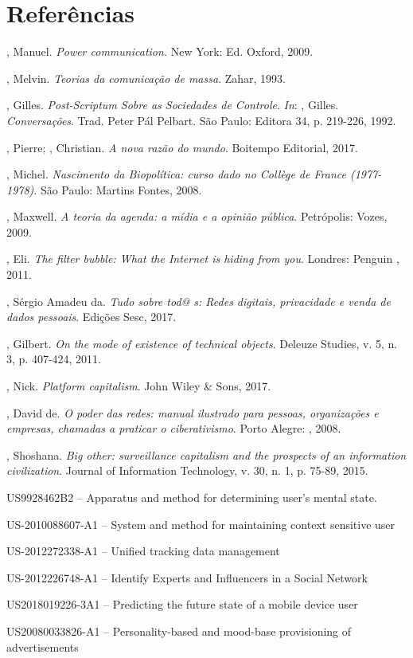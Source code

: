 \section{Referências}

, Manuel. \emph{Power communication.} New York: Ed. Oxford,
2009.

, Melvin. \emph{Teorias da comunicação de massa}. Zahar, 1993.

, Gilles. \emph{Post-Scriptum Sobre as Sociedades de Controle}. \emph{In}:
, Gilles. \emph{Conversações}. Trad. Peter Pál Pelbart. São Paulo:
Editora 34, p. 219-226, 1992.

, Pierre; , Christian. \emph{A nova razão do mundo}.
Boitempo Editorial, 2017.

, Michel. \emph{Nascimento da Biopolítica: curso dado no
Collège de France (1977-1978)}. São Paulo: Martins Fontes, 2008.

, Maxwell. \emph{A teoria da agenda: a mídia e a opinião
pública}. Petrópolis: Vozes, 2009.

, Eli. \emph{The filter bubble: What the Internet is hiding
from you}. Londres: Penguin , 2011.

, Sérgio Amadeu da. \emph{Tudo sobre tod@ s: Redes digitais,
privacidade e venda de dados pessoais}. Edições Sesc, 2017.

, Gilbert. \emph{On the mode of existence of technical
objects}. Deleuze Studies, v. 5, n. 3, p. 407-424, 2011.

, Nick. \emph{Platform capitalism}. John Wiley \& Sons, 2017.

, David de. \emph{O poder das redes: manual ilustrado para
pessoas, organizações e empresas, chamadas a praticar o ciberativismo}.
Porto Alegre: , 2008.

, Shoshana. \emph{Big other: surveillance capitalism and the
prospects of an information civilization}. Journal of Information
Technology, v. 30, n. 1, p. 75-89, 2015.\\


US9928462B2 -- Apparatus and method for determining user's mental state.

US-2010088607-A1 -- System and method for maintaining context sensitive
user

US-2012272338-A1 -- Unified tracking data management

US-2012226748-A1 -- Identify Experts and Influencers in a Social Network

US2018019226-3A1 -- Predicting the future state of a mobile device user

US20080033826-A1 -- Personality-based and mood-base provisioning of
advertisements
